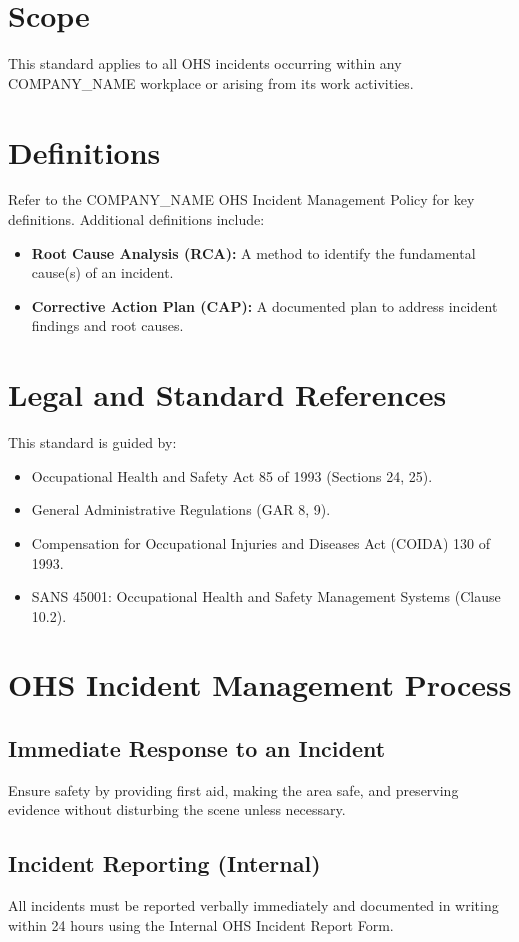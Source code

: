 \documentclass[12pt]{article}
\begin{document}
\section{Scope}
This standard applies to all OHS incidents occurring within any {{COMPANY_NAME}} workplace or arising from its work activities.

\section{Definitions}
Refer to the {{COMPANY_NAME}} OHS Incident Management Policy for key definitions. Additional definitions include:
\begin{itemize}
    \item \textbf{Root Cause Analysis (RCA):} A method to identify the fundamental cause(s) of an incident.
    \item \textbf{Corrective Action Plan (CAP):} A documented plan to address incident findings and root causes.
\end{itemize}

\section{Legal and Standard References}
This standard is guided by:
\begin{itemize}
    \item Occupational Health and Safety Act 85 of 1993 (Sections 24, 25).
    \item General Administrative Regulations (GAR 8, 9).
    \item Compensation for Occupational Injuries and Diseases Act (COIDA) 130 of 1993.
    \item SANS 45001: Occupational Health and Safety Management Systems (Clause 10.2).
\end{itemize}

\section{OHS Incident Management Process}

\subsection{Immediate Response to an Incident}
Ensure safety by providing first aid, making the area safe, and preserving evidence without disturbing the scene unless necessary.

\subsection{Incident Reporting (Internal)}
All incidents must be reported verbally immediately and documented in writing within 24 hours using the Internal OHS Incident Report Form.
\end{document}
